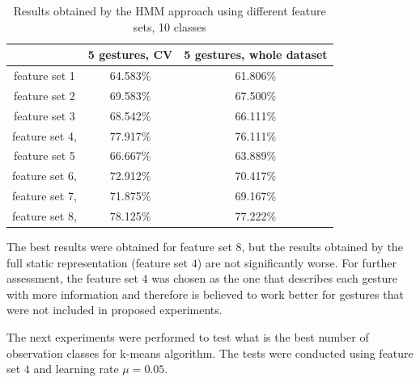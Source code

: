 \begin{table}[htp!]
	\label{tab:dyn1}
	\caption{Results obtained by the HMM approach using different feature sets, 10 classes}
    \begin{tabular}{|c|c|c|}
    \hline
    ~                                 & 5 gestures, CV & 5 gestures, whole dataset  \\ \hline
    feature set 1                     & 64.583\% & 61.806\%   \\ \hline
    feature set 2                     & 69.583\% & 67.500\%   \\ \hline
    feature set 3                     & 68.542\% & 66.111\%   \\ \hline
    feature set 4,          		  & 77.917\% & 76.111\%   \\ \hline
    feature set 5                     & 66.667\% & 63.889\%   \\ \hline
    feature set 6,                    & 72.912\% & 70.417\%   \\ \hline
    feature set 7,                    & 71.875\% & 69.167\%   \\ \hline
    feature set 8,                    & 78.125\% & 77.222\%   \\ \hline
    \end{tabular}
\end{table}
  
The best results were obtained for feature set $8$, but the results obtained by the full static representation (feature set $4$) are not significantly worse.
For further assessment, the feature set $4$ was chosen as the one that describes each gesture with more information and therefore is believed to work better for gestures that were not included in proposed experiments.

The next experiments were performed to test what is the best number of observation classes for k-means algorithm. 
The tests were conducted using feature set $4$ and learning rate $\mu=0.05$.

